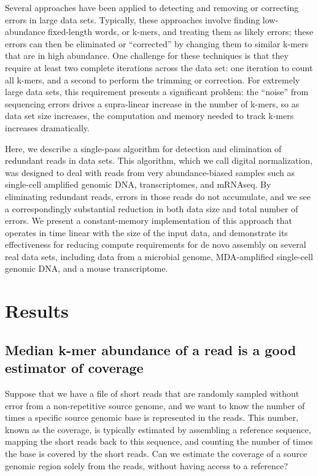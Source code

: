 \documentclass[10pt,draft]{article}
\begin{document}
Several approaches have been applied to detecting and removing or
correcting errors in large data sets.  Typically, these approaches
involve finding low-abundance fixed-length words, or k-mers, and treating
them as likely errors; these errors can then be eliminated or
``corrected'' by changing them to similar k-mers that are in high
abundance.  One challenge for these techniques is that they
require at least two complete iterations across the data set: one
iteration to count all k-mers, and a second to perform the
trimming or correction.  For extremely large data sets, this
requirement presents a significant problem: the ``noise'' from
sequencing errors drives a supra-linear increase in the number of
k-mers, so as data set size increases, the computation and memory
needed to track k-mers increases dramatically.

Here, we describe a single-pass algorithm for detection and
elimination of redundant reads in data sets.  This algorithm, which we
call digital normalization, was designed to deal with reads
from very abundance-biased samples such as single-cell amplified
genomic DNA, transcriptomes, and mRNAseq.  By eliminating redundant
reads, errors in those reads do not accumulate, and we see a
correspondingly substantial reduction in both data size and total
number of errors.  We present a constant-memory implementation of this
approach that operates in time linear with the size of the input data, and demonstrate its
effectiveness for reducing compute requirements for de novo assembly
on several real data sets, including data from a microbial genome, MDA-amplified
single-cell genomic DNA, and a mouse transcriptome.

\section*{Results}

\subsection*{Median k-mer abundance of a read is a good estimator of coverage}

Suppose that we have a file of short reads that are randomly sampled
without error from a non-repetitive source genome, and we want to know
the number of times a specific source genomic base is represented in
the reads.  This number, known as the coverage, is typically estimated
by assembling a reference sequence, mapping the short reads back to
this sequence, and counting the number of times the base is covered by
the short reads.  Can we estimate the coverage of a source genomic
region solely from the reads, without having access to a reference?
\end{document}
